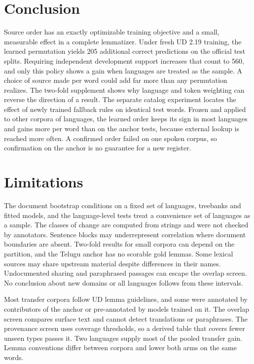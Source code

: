 \documentclass[11pt]{article}
\begin{document}
\section{Conclusion}

Source order has an exactly optimizable training objective and a small,
measurable effect in a complete lemmatizer. Under fresh UD 2.19 training,
the learned permutation yields 205 additional correct predictions on the
official test splits. Requiring independent development support increases
that count to 560, and only this policy shows a gain when languages are
treated as the sample. A choice of source made per word could add far more
than any permutation realizes. The two-fold supplement shows why language and token
weighting can reverse the direction of a result. The separate catalog
experiment locates the effect of newly trained fallback rules on identical
test words. Frozen and applied to other corpora of \trOffLang{} languages,
the learned order keeps its sign in most languages and gains more per word
than on the anchor tests, because external lookup is reached more often.
A confirmed order failed on one spoken corpus, so confirmation on the
anchor is no guarantee for a new register.

\section*{Limitations}

The document bootstrap conditions on a fixed set of languages, treebanks and
fitted models, and the language-level tests treat a convenience set of
languages as a sample. The classes of change are computed from strings and
were not checked by annotators. Sentence blocks may underrepresent correlation where document
boundaries are absent. Two-fold results for small corpora can depend on the
partition, and the Telugu anchor has no scorable gold lemmas. Some lexical
sources may share upstream material despite differences in their names.
Undocumented sharing and paraphrased passages can escape the overlap screen.
No conclusion about new domains or all languages follows from these intervals.

Most transfer corpora follow UD lemma guidelines, and some were annotated by
contributors of the anchor or pre-annotated by models trained on it. The
overlap screen compares surface text and cannot detect translations or
paraphrases. The provenance screen uses coverage thresholds, so a derived
table that covers fewer unseen types passes it. Two languages supply most
of the pooled transfer gain. Lemma conventions differ between corpora and
lower both arms on the same words.
\end{document}
